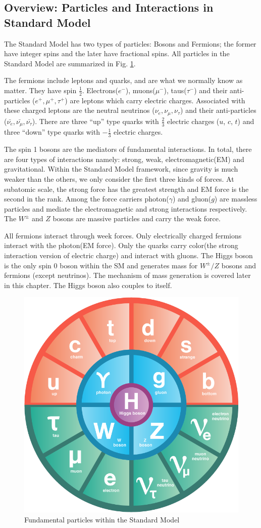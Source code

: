 \label{sec:theory-sm}
\subsection{Overview: Particles and Interactions in Standard Model}

The Standard Model has two types of particles: Bosons and Fermions; the former have integer spins and the later have fractional spins. All particles in the Standard Model are summarized in Fig. \ref{fig:theory-sm}.

The fermions include leptons and quarks, and are what we normally know as matter. They have spin $\frac{1}{2}$. Electrons($e^-$), muons($\mu^-$), taus($\tau^{-}$) and their anti-particles ($e^+,\mu^+,\tau^+$) are leptons which carry electric charges. Associated with these charged leptons are the neutral neutrinos ($\nu_e,\nu_{\mu},\nu_{\tau}$) and their anti-particles ($\bar{\nu_e},\bar{\nu_{\mu}},\bar{\nu_{\tau}}$). There are three ``up'' type quarks with $\frac{2}{3}$ electric charges ($u$, $c$, $t$) and three ``down'' type quarks with $-\frac{1}{3}$ electric charges. 

The spin 1 bosons are the mediators of fundamental interactions. In total, there are four types of interactions namely: strong, weak, electromagnetic(EM) and gravitational. Within the Standard Model framework, since gravity is much weaker than the others, we only consider the first three kinds of forces. At subatomic scale, the strong force has the greatest strength and EM force is the second in the rank. Among the force carriers photon($\gamma$) and gluon($g$) are massless particles and mediate the electromagnetic and strong interactions respectively. The $W^{\pm}$ and $Z$ bosons are massive particles and carry the weak force. 

All fermions interact through week forces. Only electrically charged fermions interact with the photon(EM force). Only the quarks carry color(the strong interaction version of electric charge) and interact with gluons. The Higgs boson is the only spin 0 boson within the SM and generates mass for $W^{\pm}/Z$ bosons and fermions (except neutrinos). The mechanism of mass generation is covered later in this chapter. The Higgs boson also couples to itself. 

\begin{figure}[htpb!]
\begin{center}
  \includegraphics[width=0.45\linewidth]{figures/theory/SM}
\caption{Fundamental particles within the Standard Model}
\label{fig:theory-sm}
\end{center}
\end{figure}

